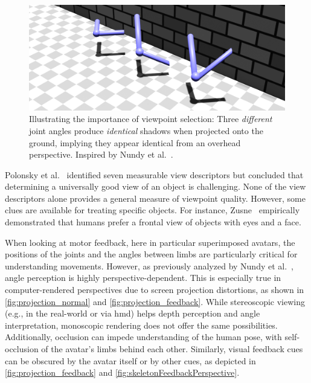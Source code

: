 \begin{figure}[t!h]
	\centering
	\includegraphics[width=\linewidth]{pictures/projection_normal.png}
	\caption[Illustrating the importance of viewpoint selection.]{Illustrating the importance of viewpoint selection: Three \emph{different} joint angles produce \emph{identical} shadows when projected onto the ground, implying they appear identical from an overhead perspective. Inspired by Nundy et al.~\cite{nundy2000wam}.}
	\label{fig:projection_normal}
\end{figure}

Polonsky et al.~\cite{polonsky2005wii} identified seven measurable view descriptors but concluded that determining a universally good view of an object is challenging. None of the view descriptors alone provides a general measure of viewpoint quality. However, some clues are available for treating specific objects. For instance, Zusne~\cite{zusne1970vpf} empirically demonstrated that humans prefer a frontal view of objects with eyes and a face.

When looking at motor feedback, here in particular superimposed avatars, the positions of the joints and the angles between limbs are particularly critical for understanding movements. However, as previously analyzed by Nundy et al.~\cite{nundy2000wam}, angle perception is highly perspective-dependent. This is especially true in computer-rendered perspectives due to screen projection distortions, as shown in \autoref{fig:projection_normal} and \autoref{fig:projection_feedback}. While stereoscopic viewing (e.g., in the real-world or via \acrshort{hmd}) helps depth perception and angle interpretation, monoscopic rendering does not offer the same possibilities. Additionally, occlusion can impede understanding of the human pose, with self-occlusion of the avatar's limbs behind each other. Similarly, visual feedback cues can be obscured by the avatar itself or by other cues, as depicted in \autoref{fig:projection_feedback} and \autoref{fig:skeletonFeedbackPerspective}.


